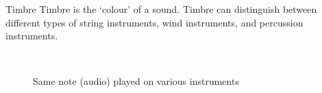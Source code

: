 \documentclass[11pt]{beamer}
\begin{document}
	\begin{frame}
		\begin{block}{Timbre}
			Timbre is the `colour' of a sound. Timbre can distinguish between different types of string instruments, wind instruments, and percussion instruments.
		\end{block}
		\begin{figure}[!htb]
			\centering
			\\
			\caption{Same note (audio) played on various instruments}
			\label{fig:instr}
		\end{figure}
	\end{frame}
\end{document}
